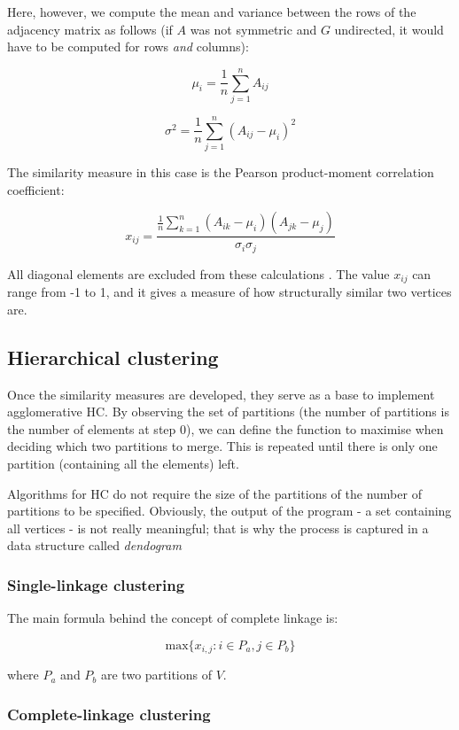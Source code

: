 \documentclass[12pt,a4paper]{article}
\begin{document}
Here, however, we compute the mean and variance between the rows of
the adjacency matrix as follows (if $A$ was not symmetric and $G$
undirected, it would have to be computed for rows \emph{and} columns):

$$ \mu_i = \frac{1}{n} \sum_{j=1}^{n} A_{ij} $$

$$ \sigma^2 = \frac{1}{n} \sum_{j=1}^{n} (A_{ij} - \mu_i)^2 $$

The similarity measure in this case is the Pearson product-moment
correlation coefficient:

$$ x_{ij} = \frac{\frac{1}{n}\sum_{k=1}^{n}(A_{ik} -
  \mu_i)(A_{jk}-\mu_j)}{\sigma_i\sigma_j} $$

All diagonal elements are excluded from these calculations
\cite[p.~369]{socionetwork}. The value $x_{ij}$ can range from -1 to
1, and it gives a measure of how structurally similar two vertices
are.

\subsection{Hierarchical clustering}

Once the similarity measures are developed, they serve as a base to
implement agglomerative HC. By observing the set of partitions (the
number of partitions is the number of elements at step 0), we can
define the function to maximise when deciding which two partitions to
merge. This is repeated until there is only one partition (containing
all the elements) left.

Algorithms for HC do not require the size of the partitions of the
number of partitions to be specified. Obviously, the output of the
program - a set containing all vertices - is not really meaningful;
that is why the process is captured in a data structure called
\emph{dendogram}

\subsubsection{Single-linkage clustering}

The main formula behind the concept of complete linkage is:

$$ \mathrm{max}\{x_{i,j} : i \in P_a, j \in P_b\} $$

where ${P_a}$ and $P_b$ are two partitions of $V$.

\subsubsection{Complete-linkage clustering}
\end{document}
